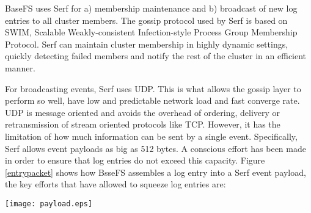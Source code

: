 \documentclass{sig-alternate}
\begin{document}
BaseFS uses Serf for a) membership maintenance and b) broadcast of new log entries to all cluster members. The gossip protocol used by Serf is based on SWIM, Scalable Weakly-consistent Infection-style Process Group Membership Protocol\cite{SWIM}. Serf can maintain cluster membership in highly dynamic settings, quickly detecting failed members and notify the rest of the cluster in an efficient manner.

For broadcasting events, Serf uses UDP. This is what allows the gossip layer to perform so well, have low and predictable network load and fast converge rate. UDP is message oriented and avoids the overhead of ordering, delivery or retransmission of stream oriented protocols like TCP. However, it has the limitation of how much information can be sent by a single event. Specifically, Serf allows event payloads as big as 512 bytes. A conscious effort has been made in order to ensure that log entries do not exceed this capacity. Figure \ref{entrypacket} shows how BsseFS assembles a log entry into a Serf event payload, the key efforts that have allowed to squeeze log entries are: 


\begin{figure*}
\centering
\texttt{[image: payload.eps]}
\caption{A sample black and white graphic (.eps format)
that has been resized with the \texttt{epsfig} command.}
\label{entrypacket}
\end{figure*}


\end{document}
